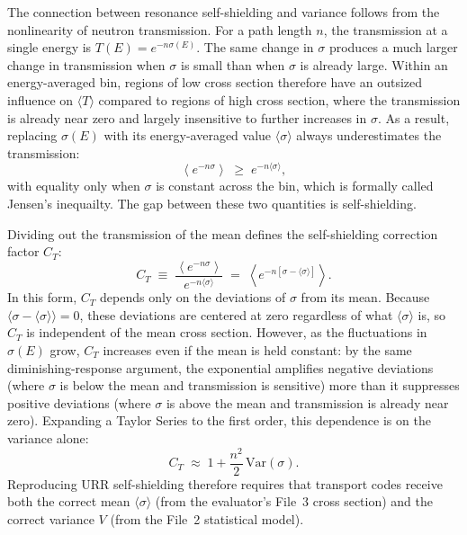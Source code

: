 \documentclass{style/nseJournal}
\newcommand{\sbin}{\langle \sigma \rangle}
\begin{document}
The connection between resonance self-shielding and variance follows from the nonlinearity of neutron transmission. For a path length $n$, the transmission at a single energy is $T(E) = e^{-n\sigma(E)}$. The same change in $\sigma$ produces a much larger change in transmission when $\sigma$ is small than when $\sigma$ is already large. Within an energy-averaged bin, regions of low cross section therefore have an outsized influence on $\langle T \rangle$ compared to regions of high cross section, where the transmission is already near zero and largely insensitive to further increases in $\sigma$. As a result, replacing $\sigma(E)$ with its energy-averaged value $\langle\sigma\rangle$ always underestimates the transmission:
\begin{equation}
\left\langle e^{-n\sigma} \right\rangle \;\geq\; e^{-n\langle\sigma\rangle},
\label{eq:jensen}
\end{equation}
with equality only when $\sigma$ is constant across the bin, which is formally called Jensen's inequailty.
The gap between these two quantities is self-shielding.

Dividing out the transmission of the mean defines the self-shielding correction factor $C_T$:
\begin{equation}
C_T \;\equiv\; \frac{\left\langle e^{-n\sigma}\right\rangle}{e^{-n\langle\sigma\rangle}}
\;=\; \left\langle e^{-n\left[\sigma - \langle\sigma\rangle\right]}\right\rangle.
\label{eq:ss-factor}
\end{equation}
In this form, $C_T$ depends only on the deviations of $\sigma$ from its mean.
Because $\langle \sigma - \langle\sigma\rangle \rangle = 0$, these deviations are centered at zero
regardless of what $\langle\sigma\rangle$ is, so $C_T$ is independent of the mean cross section.
However, as the fluctuations in $\sigma(E)$ grow, $C_T$ increases even if the mean is held constant:
by the same diminishing-response argument, the exponential amplifies negative deviations
(where $\sigma$ is below the mean and transmission is sensitive)
more than it suppresses positive deviations
(where $\sigma$ is above the mean and transmission is already near zero).
Expanding a Taylor Series to the first order, this dependence is on the variance alone:
\begin{equation}
C_T \;\approx\; 1 + \frac{n^2}{2}\,\mathrm{Var}(\sigma).
\label{eq:transmission_variance_link}
\end{equation}
Reproducing URR self-shielding therefore requires that transport codes receive both the correct mean $\sbin$ (from the evaluator's File~3 cross section) and the correct variance $V$ (from the File~2 statistical model).
\end{document}
